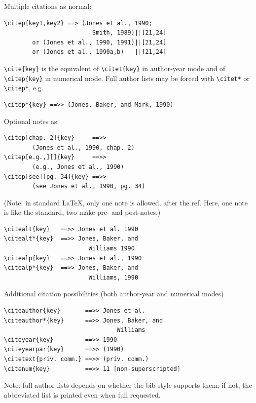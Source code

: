 \documentclass[numbers,webpdf]{ima-authoring-template}%
\theoremstyle{thmstyletwo}%
\numberwithin{equation}{section}
\begin{document}
\noindent
Multiple citations as normal:


{%
\begin{verbatim}
\citep{key1,key2} ==> (Jones et al., 1990;
                         Smith, 1989)||[21,24]
        or (Jones et al., 1990, 1991)||[21,24]
        or (Jones et al., 1990a,b)   ||[21,24]
\end{verbatim}}


\noindent
\verb+\cite{key}+ is the equivalent of \verb+\citet{key}+ in author-year mode
and  of \verb+\citep{key}+ in numerical mode. Full author lists may be forced with
\verb+\citet*+ or \verb+\citep*+, e.g.


{%
\begin{verbatim}
\citep*{key} ==>> (Jones, Baker, and Mark, 1990)
\end{verbatim}}


\noindent
Optional notes as:


{%
\begin{verbatim}
\citep[chap. 2]{key}     ==>>
        (Jones et al., 1990, chap. 2)
\citep[e.g.,][]{key}     ==>>
        (e.g., Jones et al., 1990)
\citep[see][pg. 34]{key} ==>>
        (see Jones et al., 1990, pg. 34)
\end{verbatim}}


\noindent
(Note: in standard LaTeX, only one note is allowed, after the ref.
Here, one note is like the standard, two make pre- and post-notes.)


{%
\begin{verbatim}
\citealt{key}   ==>> Jones et al. 1990
\citealt*{key}  ==>> Jones, Baker, and
                        Williams 1990
\citealp{key}   ==>> Jones et al., 1990
\citealp*{key}  ==>> Jones, Baker, and
                        Williams, 1990
\end{verbatim}}


\noindent
Additional citation possibilities (both author-year and numerical modes)


{%
\begin{verbatim}
\citeauthor{key}       ==>> Jones et al.
\citeauthor*{key}      ==>> Jones, Baker, and
                                Williams
\citeyear{key}         ==>> 1990
\citeyearpar{key}      ==>> (1990)
\citetext{priv. comm.} ==>> (priv. comm.)
\citenum{key}          ==>> 11 [non-superscripted]
\end{verbatim}}


\noindent
Note: full author lists depends on whether the bib style supports them;
if not, the abbreviated list is printed even when full requested.
\end{document}
